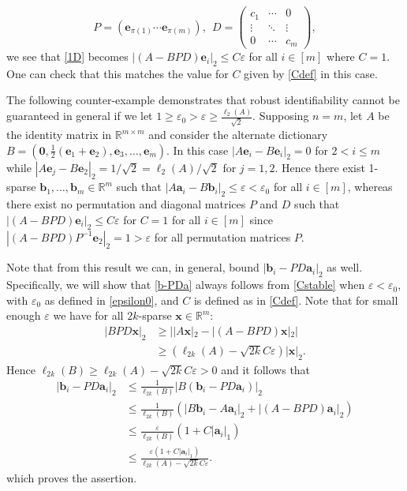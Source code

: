 \documentclass[journal, onecolumn]{IEEEtran}
\begin{document}
\begin{equation}\label{PandD}
P = \left( \mathbf{e}_{\pi(1)} \cdots \mathbf{e}_{\pi(m)}\right), \ \ D = \left(\begin{array}{ccc}c_1 & \cdots & 0 \\\vdots & \ddots & \vdots \\0 & \cdots & c_m\end{array}\right),
\end{equation}
%
we see that \eqref{1D} becomes $|(A - BPD)\mathbf{e}_i|_2 \leq C\varepsilon$ for all $i \in [m]$ where $C=1$. One can check that this matches the value for $C$ given by \eqref{Cdef} in this case. 

The following counter-example demonstrates that robust identifiability cannot be guaranteed in general if we let $1 \geq \varepsilon_0 > \varepsilon \geq\frac{\ell_2(A)}{\sqrt{2}}$. Supposing $n=m$, let $A$ be the identity matrix in $\mathbb{R}^{m \times m}$ and consider the alternate dictionary $B = \left( \mathbf{0}, \frac{1}{2}(\mathbf{e}_1 + \mathbf{e}_2), \mathbf{e}_3, \ldots, \mathbf{e}_{m} \right)$. In this case $|A\mathbf{e}_i - B\mathbf{e}_i|_2 = 0$ for $2 < i \leq m$ while $|A\mathbf{e}_j - B\mathbf{e}_2|_2 = 1/\sqrt{2} = \ell_2(A)/\sqrt{2}$ for $j = 1, 2$. Hence there exist 1-sparse $\mathbf{b}_1, \ldots, \mathbf{b}_m \in \mathbb{R}^m$ such that $|A\mathbf{a}_i - B\mathbf{b}_i|_2 \leq \varepsilon < \varepsilon_0$ for all $i \in [m]$, whereas there exist no permutation and diagonal matrices $P$ and $D$ such that $|(A - BPD)\mathbf{e}_i|_2 \leq C\varepsilon$ for $C=1$ for all $i \in [m]$ since $|(A - BPD)P^{-1}\mathbf{e}_2|_2 = 1 > \varepsilon$ for all permutation matrices $P$.

Note that from this result we can, in general, bound $|\mathbf{b}_i - PD\mathbf{a}_i|_2$ as well. Specifically, we will show that \eqref{b-PDa} always follows from \eqref{Cstable} when $\varepsilon < \varepsilon_0$, with $\varepsilon_0$ as defined in \eqref{epsilon0}, and $C$ is defined as in \eqref{Cdef}. Note that for small enough $\varepsilon$ we have for all $2k$-sparse $\mathbf{x} \in \mathbb{R}^m$:
\begin{align*}
|BPD\mathbf{x}|_2 &\geq | |A\mathbf{x}|_2 - |(A-BPD)\mathbf{x}|_2 | \\
&\geq (\ell_{2k}(A) - \sqrt{2k}C\varepsilon ) |\mathbf{x}|_2.
\end{align*}
Hence $\ell_{2k}(B) \geq \ell_{2k}(A) - \sqrt{2k}C\varepsilon > 0$ and it follows that
\begin{align*}
|\mathbf{b}_i - PD\mathbf{a}_i|_2
&\leq \frac{1}{\ell_{2k}(B)}|B(\mathbf{b}_i - PD\mathbf{a}_i)|_2 \\
&\leq \frac{1}{\ell_{2k}(B)} (|B\mathbf{b}_i - A\mathbf{a}_i|_2 + |(A - BPD)\mathbf{a}_i|_2) \\
&\leq \frac{\varepsilon}{\ell_{2k}(B)}(1+C|\mathbf{a}_i|_1) \\
&\leq \frac{\varepsilon(1+C|\mathbf{a}_i|_1)}{\ell_{2k}(A) - \sqrt{2k}C\varepsilon}.
\end{align*}
%
which proves the assertion.  
\end{document}
